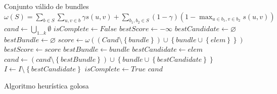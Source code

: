 \begin{algorithm}[H]
\begin{algorithmic}[1]
\ENSURE Conjunto válido de bundles
\STATE $\omega(S) = \sum_{b \in S}{\sum_{u,v \in b}{\gamma s(u,v)}} + \sum_{b_1,b_2 \in S}{(1-\gamma) (1-\max_{u \in b_1, v \in b_2}{s(u,v)})}$
\STATE $cand \leftarrow \bigcup_{1 \ldots k}\emptyset$
\STATE $isComplete \leftarrow False$
  \STATE $bestScore \leftarrow -\infty$
  \STATE $bestCandidate \leftarrow \varnothing$
  \STATE $bestBundle \leftarrow \varnothing$
        \STATE $score \leftarrow \omega((Cand \setminus \left\{bundle\right\}) \cup \left\{bundle \cup \left\{elem\right\}\right\})$
          \STATE $bestScore \leftarrow score$
          \STATE $bestBundle \leftarrow bundle$
          \STATE $bestCandidate \leftarrow elem$
        \ENDIF
      \ENDIF
    \ENDFOR
  \ENDFOR
		\STATE $cand \leftarrow (cand \setminus \left\{bestBundle\right\}) \cup \left\{bundle \cup \left\{bestCandidate\right\}\right\}$
		\STATE $I \leftarrow I \setminus \left\{bestCandidate\right\}$
	\ELSE
		\STATE $isComplete \leftarrow True$
	\ENDIF
\ENDWHILE
\RETURN $cand$
\end{algorithmic}
\caption{Algoritmo heurística golosa}\label{alg:algHeuGol}
\end{algorithm}

